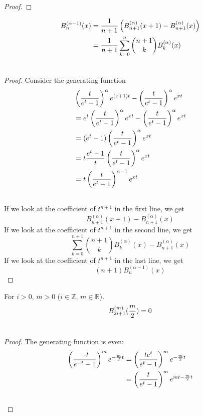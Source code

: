 \documentclass[fleqn,a4paper,9pt]{article}
\begin{document}
\begin{flushleft}
\begin{proof}
\end{proof}
\begin{proposition}\label{alphaMinus}
\begin{align}
B_n^{(\alpha-1)}(x)&=\frac{1}{n+1}\left(B_{n+1}^{(\alpha)}(x+1)-B_{n+1}^{(\alpha)}(x)\right)\\\notag
&=\frac{1}{n+1}\sum_{k=0}^n\binom{n+1}{k}B_k^{(\alpha)}(x)\\\notag
\end{align}
\end{proposition}
\begin{proof}
Consider the generating function
\begin{align}
&\left(\frac{t}{e^t-1}\right)^\alpha e^{(x+1)t}-\left(\frac{t}{e^t-1}\right)^\alpha e^{xt}\\\notag
&=e^t\left(\frac{t}{e^t-1}\right)^\alpha e^{xt}-\left(\frac{t}{e^t-1}\right)^\alpha e^{xt}\\\notag
&=(e^t-1)\left(\frac{t}{e^t-1}\right)^\alpha e^{xt}\\\notag
&=t\frac{e^t-1}{t}\left(\frac{t}{e^t-1}\right)^\alpha e^{xt}\\\notag
&=t\left(\frac{t}{e^t-1}\right)^{\alpha-1} e^{xt}\\\notag
\end{align}
If we look at the coefficient of  $t^{n+1}$ in the first line, we get $$B_{n+1}^{(\alpha)}(x+1)-B_{n+1}^{(\alpha)}(x)$$
If we look at the coefficient of  $t^{n+1}$ in the second line, we get $$\sum_{k=0}^{n+1}\binom{n+1}{k}B_k^{(\alpha)}(x)-B_{n+1}^{(\alpha)}(x)$$
If we look at the coefficient of $t^{n+1}$ in the last line, we get $$(n+1)B_n^{(\alpha-1)}(x)$$
\end{proof}
\begin{proposition} \label{oddZero}
  For $i>0$, $m>0$ ($i\in\mathbb{Z}$, $m\in\mathbb{R}$).
\begin{align}
B_{2i+1}^{(m)}(\frac{m}{2})&=0\\\notag
\end{align}
\end{proposition}
\begin{proof}
The generating function is even:
\begin{align}
\left(\frac{-t}{e^{-t}-1}\right)^{m} e^{-\frac{m}{2}t}&=\left(\frac{te^t}{e^{t}-1}\right)^{m} e^{-\frac{m}{2}t}\\\notag
&=\left(\frac{t}{e^{t}-1}\right)^{m} e^{mt-\frac{m}{2}t}\\\notag
\end{align}
\end{proof}


\end{flushleft}
\end{document}
